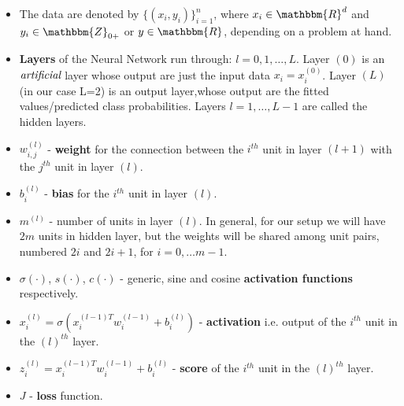 \documentclass{article} %
\begin{document}
\begin{itemize}
\item The data are denoted by $\{(x_i,y_i)\}_{i=1}^{n}$, where $x_i\in \mathbbm{R}^{d}$ and $y_i\in\mathbbm{Z}_{0+}$ or $y\in\mathbbm{R}$, depending on a problem at hand.
\item \textbf{Layers} of the Neural Network run through: $l = 0,1,\dots,L$. Layer $(0)$ is an $\emph{artificial}$ layer whose output are just the input data $x_i = x_i^{(0)}$. Layer $(L)$ (in our case L=2) is an output layer,whose output are the fitted values/predicted class probabilities. Layers $l=1,\dots,L-1$ are called the hidden layers.
\item $w_{i,j}^{(l)}$ - \textbf{weight} for the connection between the $i^{th}$ unit in layer $(l+1)$ with the $j^{th}$ unit in layer $(l)$.
\item $b_{i}^{(l)}$ - \textbf{bias} for the $i^{th}$ unit in layer $(l)$.
\item $m^{(l)}$ - number of units in layer $(l)$. In general, for our setup we will have $2m$ units in hidden layer, but the weights will be shared among unit pairs, numbered $2i$ and $2i+1$, for $i=0,\dots m-1$.
\item $\sigma(\cdot)$, $s(\cdot)$, $c(\cdot)$ - generic, sine and cosine \textbf{activation functions} respectively.
\item $x_i^{(l)} = \sigma(x_i^{(l-1)T}w_i^{(l-1)}+b_i^{(l)})$ - \textbf{activation} i.e. output of the $i^{th}$ unit in the $(l)^{th}$ layer.
\item $z_i^{(l)} = x_i^{(l-1)T}w_i^{(l-1)}+b_i^{(l)}$ - \textbf{score} of the $i^{th}$ unit in the $(l)^{th}$ layer.
\item $J$ - \textbf{loss} function.
\end{itemize}

\end{document}
